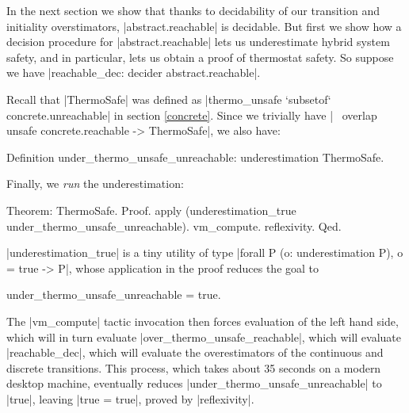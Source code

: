 \documentclass[runningheads]{llncs}
\newcommand{\weg}[1]{}
\begin{document}
In the next section we show that thanks to decidability of our
transition and initiality overstimators, |abstract.reachable| is
decidable. But first we show how a
decision procedure for |abstract.reachable| lets us underestimate
hybrid system safety, and in particular, lets us obtain a proof of
thermostat safety. So suppose we have |reachable_dec: decider abstract.reachable|.
\weg{
And suppose we are given the following specification of unsafe concrete states, covered by a finite list of abstract states:
\begin{code}
  Variables
    (unsafe: concrete.State -> Prop)
    (astates: list abstract.State)
    (astates_cover_unsafe: forall s, unsafe s -> forall r, s `elem` r -> r `elem` astates).
\end{code}

Then, using |reachable_dec| and |unreachable_respect|, we can easily define
\begin{code}
  Definition over_unsafe_reachable: overestimation (overlap unsafe concrete.reachable).
\end{code}
Taking |unsafe := thermo_unsafe| and a suitable abstract cover, we obtain
\begin{code}
  Definition over_thermo_unsafe_reachable:
    overestimation (overlap thermo_unsafe concrete.reachable).
\end{code}
}
Recall that |ThermoSafe| was defined as |thermo_unsafe `subsetof` concrete.unreachable| in section \ref{concrete}. Since we trivially have |~ overlap unsafe concrete.reachable -> ThermoSafe|, we also have:
\begin{code}
Definition under_thermo_unsafe_unreachable: underestimation ThermoSafe.
\end{code}
Finally, we \emph{run} the underestimation:
\begin{code}
Theorem: ThermoSafe.
Proof.
  apply (underestimation_true under_thermo_unsafe_unreachable).
  vm_compute.  reflexivity.
Qed.
\end{code}
|underestimation_true| is a tiny utility of type |forall P (o: underestimation P), o = true -> P|, whose application in the proof reduces the goal to
\begin{code}under_thermo_unsafe_unreachable = true.\end{code} The |vm_compute| tactic invocation then forces evaluation of the left hand side, which will in turn evaluate |over_thermo_unsafe_reachable|, which will evaluate |reachable_dec|, which will evaluate the overestimators of the continuous and discrete transitions. This process, which takes about 35 seconds on a modern desktop machine, eventually reduces |under_thermo_unsafe_unreachable| to |true|, leaving |true = true|, proved by |reflexivity|.
\end{document}
